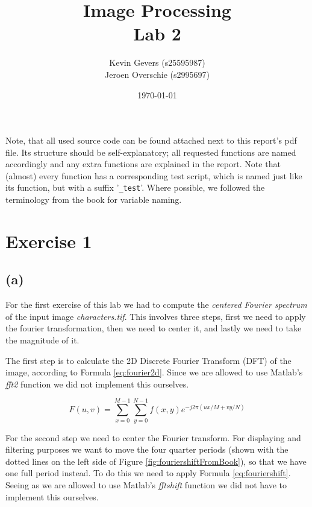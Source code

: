 \documentclass{article}
\title{Image Processing\\
    Lab 2}
\author{Kevin Gevers (s25595987) \\ Jeroen Overschie (s2995697)}
\date{\today}
\begin{document}
\maketitle

Note, that all used source code can be found attached next to this report's pdf file. Its structure should be self-explanatory; all requested functions are named accordingly and any extra functions are explained in the report. Note that (almost) every function has a corresponding test script, which is named just like its function, but with a suffix '\texttt{\_test}'. Where possible, we followed the terminology from the book \citep{gonzalez2008digital} for variable naming.

\section*{Exercise 1}
\subsection{(a)}
For the first exercise of this lab we had to compute the \textit{centered Fourier spectrum} of the input image \textit{characters.tif}. This involves three steps, first we need to apply the fourier transformation, then we need to center it, and lastly we need to take the magnitude of it. 

The first step is to calculate the 2D Discrete Fourier Transform (DFT) of the image, according to Formula \ref{eq:fourier2d}. Since we are allowed to use Matlab's \textit{fft2} function we did not implement this ourselves.

\begin{equation}\label{eq:fourier2d}
    F(u, v)=\sum_{x=0}^{M-1} \sum_{y=0}^{N-1} f(x, y) e^{-j 2 \pi(u x / M+v y / N)}
\end{equation}

For the second step we need to center the Fourier transform. For displaying and filtering purposes we want to move the four quarter periods (shown with the dotted lines on the left side of Figure \ref{fig:fouriershiftFromBook}), so that we have one full period instead. To do this we need to apply Formula \ref{eq:fouriershift}. Seeing as we are allowed to use Matlab's \textit{fftshift} function we did not have to implement this ourselves.
\end{document}

